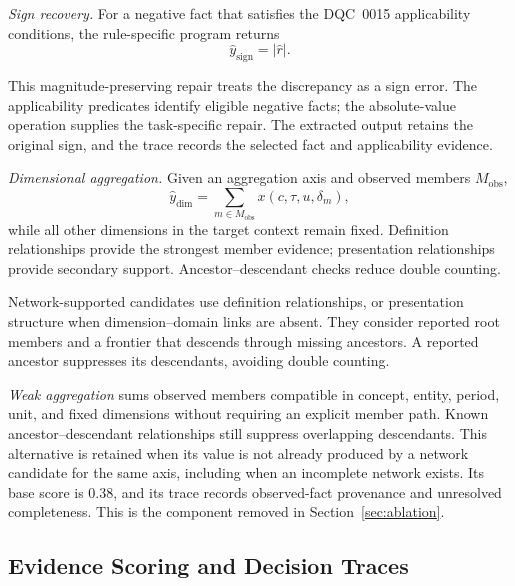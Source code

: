 \documentclass[conference]{IEEEtran}
\begin{document}
\textit{Sign recovery.} For a negative fact that satisfies the DQC~0015 applicability conditions, the rule-specific program returns
\begin{equation}
\hat y_{\mathrm{sign}}=|\hat r|.
\end{equation}

This magnitude-preserving repair treats the discrepancy as a sign error. The applicability predicates identify eligible negative facts; the absolute-value operation supplies the task-specific repair. The extracted output retains the original sign, and the trace records the selected fact and applicability evidence.

\textit{Dimensional aggregation.} Given an aggregation axis and observed members $M_{\mathrm{obs}}$,
\begin{equation}
\hat y_{\mathrm{dim}}=\sum_{m\in M_{\mathrm{obs}}}
x(c,\tau,u,\delta_m),
\end{equation}
while all other dimensions in the target context remain fixed. Definition relationships provide the strongest member evidence; presentation relationships provide secondary support. Ancestor--descendant checks reduce double counting.

Network-supported candidates use definition relationships, or presentation structure when dimension--domain links are absent. They consider reported root members and a frontier that descends through missing ancestors. A reported ancestor suppresses its descendants, avoiding double counting.

\emph{Weak aggregation} sums observed members compatible in concept, entity, period, unit, and fixed dimensions without requiring an explicit member path. Known ancestor--descendant relationships still suppress overlapping descendants. This alternative is retained when its value is not already produced by a network candidate for the same axis, including when an incomplete network exists. Its base score is 0.38, and its trace records observed-fact provenance and unresolved completeness. This is the component removed in Section~\ref{sec:ablation}.

\subsection{Evidence Scoring and Decision Traces}
\label{sec:scoring}
\end{document}
